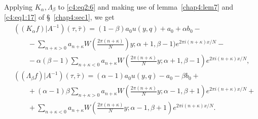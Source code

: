 Applying $K_{\alpha},\Lambda_{\beta}$ to \eqref{c4:eq2:6} and making 
use of lemma~\ref{chap4:lem7} and \eqref{c4:eq1:17} of \S~\ref{chap4:sec1}, we get
\begin{align*}
&((K_{\alpha}f)|A^{-1}) (\tau,\bar{\tau}) = (1-\beta) a_0 u(y,q) +
  a_0 + \alpha b_0 -\\
&\qquad - \sum_{n+\kappa >0} a_{n+\kappa} W (\frac{2\pi(n+\kappa)}{N}) y;
  \alpha+1, \beta-1) e^{2\pi i(n+\kappa)x/N} - \tag{7}\label{c4:eq2:7}\\
&\qquad - \alpha(\beta-1) \sum_{n+\kappa<0} a_{n+\kappa} W
  (\frac{2\pi(n+\kappa)}{N}y; \alpha +1, \beta-1) e^{2\pi
    i(n+\kappa)x/N},\\
&((\Lambda_{\beta}f)|A^{-1})(\tau, \bar{\tau})  = (\alpha-1)
 a_0 u(y,q) -a_0 -\beta b_0 + \\
&\qquad + (\alpha-1) \beta \sum_{n+\kappa>0} a_{n+\kappa} W
 (\frac{2\pi(n+\kappa)}{N} y;\alpha-1, \beta+1) e^{2\pi
   i(n+\kappa)x/N} + \tag{8}\label{c4:eq2:8}\\
&\qquad + \sum_{n+\kappa < 0} a_{n+\kappa} W (\frac{2\pi(n+\kappa)}{N} y;
 \alpha-1, \beta+1) e^{2\pi i(n+\kappa)x/N}.
\end{align*}\pageoriginale

